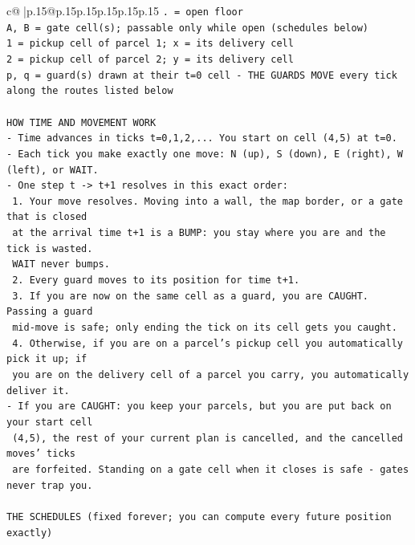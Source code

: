 \documentclass{article}
\begin{document}
{\begin{supertabular}{c@{$\;$}|p{.15\linewidth}@{}p{.15\linewidth}p{.15\linewidth}p{.15\linewidth}p{.15\linewidth}p{.15\linewidth}}
{{{\texttt{. = open floor} \\
\texttt{A, B = gate cell(s); passable only while open (schedules below)} \\
\texttt{1 = pickup cell of parcel 1; x = its delivery cell} \\
\texttt{2 = pickup cell of parcel 2; y = its delivery cell} \\
\texttt{p, q = guard(s) drawn at their t=0 cell {-} THE GUARDS MOVE every tick along the routes listed below} \\
\\ 
\texttt{HOW TIME AND MOVEMENT WORK} \\
\texttt{{-} Time advances in ticks t=0,1,2,... You start on cell (4,5) at t=0.} \\
\texttt{{-} Each tick you make exactly one move: N (up), S (down), E (right), W (left), or WAIT.} \\
\texttt{{-} One step t {-}> t+1 resolves in this exact order:} \\
\texttt{  1. Your move resolves. Moving into a wall, the map border, or a gate that is closed} \\
\texttt{     at the arrival time t+1 is a BUMP: you stay where you are and the tick is wasted.} \\
\texttt{     WAIT never bumps.} \\
\texttt{  2. Every guard moves to its position for time t+1.} \\
\texttt{  3. If you are now on the same cell as a guard, you are CAUGHT. Passing a guard} \\
\texttt{     mid{-}move is safe; only ending the tick on its cell gets you caught.} \\
\texttt{  4. Otherwise, if you are on a parcel's pickup cell you automatically pick it up; if} \\
\texttt{     you are on the delivery cell of a parcel you carry, you automatically deliver it.} \\
\texttt{{-} If you are CAUGHT: you keep your parcels, but you are put back on your start cell} \\
\texttt{  (4,5), the rest of your current plan is cancelled, and the cancelled moves' ticks} \\
\texttt{  are forfeited. Standing on a gate cell when it closes is safe {-} gates never trap you.} \\
\\ 
\texttt{THE SCHEDULES (fixed forever; you can compute every future position exactly)} \\
}}}
\end{supertabular}}
\end{document}
